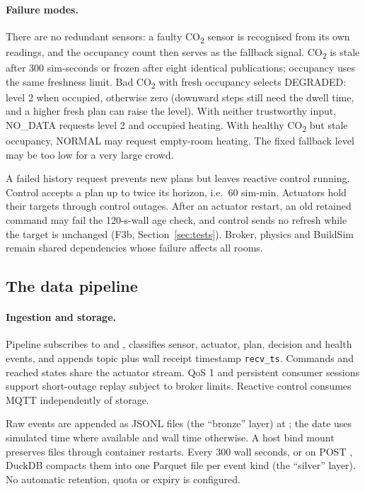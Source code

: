 \documentclass[11pt,a4paper]{article}
\begin{document}
\paragraph{Failure modes.}
There are no redundant sensors: a faulty CO\textsubscript{2} sensor is recognised from its own readings, and the occupancy count then serves as the fallback signal. CO\textsubscript{2} is stale after 300 sim-seconds or frozen after eight identical publications; occupancy uses the same freshness limit. Bad CO\textsubscript{2} with fresh occupancy selects DEGRADED: level 2 when occupied, otherwise zero (downward steps still need the dwell time, and a higher fresh plan can raise the level). With neither trustworthy input, NO\_DATA requests level 2 and occupied heating. With healthy CO\textsubscript{2} but stale occupancy, NORMAL may request empty-room heating. The fixed fallback level may be too low for a very large crowd.

A failed history request prevents new plans but leaves reactive control running. Control accepts a plan up to twice its horizon, i.e.\ 60 sim-min. Actuators hold their targets through control outages. After an actuator restart, an old retained command may fail the 120-s-wall age check, and control sends no refresh while the target is unchanged (F3b, Section~\ref{sec:tests}). Broker, physics and BuildSim remain shared dependencies whose failure affects all rooms.

\subsection{The data pipeline}\label{sec:pipeline}
\paragraph{Ingestion and storage.}
Pipeline subscribes to \protect{} and \protect{}, classifies sensor, actuator, plan, decision and health events, and appends topic plus wall receipt timestamp \texttt{recv\_ts}. Commands and reached states share the actuator stream. QoS 1 and persistent consumer sessions support short-outage replay subject to broker limits. Reactive control consumes MQTT independently of storage.

Raw events are appended as JSONL files (the ``bronze'' layer) at \protect{}; the date uses simulated time where available and wall time otherwise. A host bind mount preserves files through container restarts. Every 300 wall seconds, or on POST \protect{}, DuckDB compacts them into one Parquet file per event kind (the ``silver'' layer). No automatic retention, quota or expiry is configured.
\end{document}
